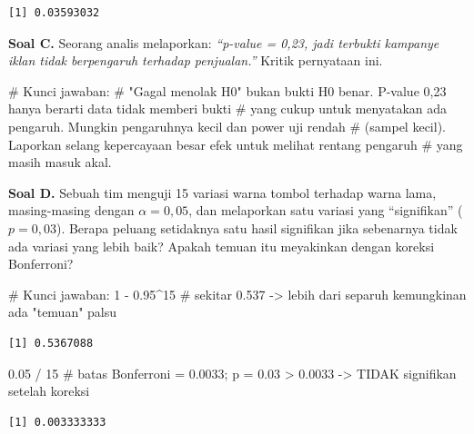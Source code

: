 \documentclass[
  indonesian,
  letterpaper,
]{book}
\newenvironment{Shaded}{\begin{snugshade}}{\end{snugshade}}
\newcommand{\CommentTok}[1]{\textcolor[rgb]{0.37,0.37,0.37}{#1}}
\newcommand{\DecValTok}[1]{\textcolor[rgb]{0.68,0.00,0.00}{#1}}
\newcommand{\FloatTok}[1]{\textcolor[rgb]{0.68,0.00,0.00}{#1}}
\newcommand{\SpecialCharTok}[1]{\textcolor[rgb]{0.37,0.37,0.37}{#1}}
\begin{document}
\begin{verbatim}
[1] 0.03593032
\end{verbatim}

\textbf{Soal C.} Seorang analis melaporkan: \emph{``p-value = 0,23, jadi
terbukti kampanye iklan tidak berpengaruh terhadap penjualan.''} Kritik
pernyataan ini.

\begin{Shaded}
\begin{Highlighting}[]
\CommentTok{\# Kunci jawaban:}
\CommentTok{\# "Gagal menolak H0" bukan bukti H0 benar. P{-}value 0,23 hanya berarti data tidak memberi bukti}
\CommentTok{\# yang cukup untuk menyatakan ada pengaruh. Mungkin pengaruhnya kecil dan power uji rendah}
\CommentTok{\# (sampel kecil). Laporkan selang kepercayaan besar efek untuk melihat rentang pengaruh}
\CommentTok{\# yang masih masuk akal.}
\end{Highlighting}
\end{Shaded}

\textbf{Soal D.} Sebuah tim menguji 15 variasi warna tombol terhadap
warna lama, masing-masing dengan \(\alpha = 0{,}05\), dan melaporkan
satu variasi yang ``signifikan'' (\(p = 0{,}03\)). Berapa peluang
setidaknya satu hasil signifikan jika sebenarnya tidak ada variasi yang
lebih baik? Apakah temuan itu meyakinkan dengan koreksi Bonferroni?

\begin{Shaded}
\begin{Highlighting}[]
\CommentTok{\# Kunci jawaban:}
\DecValTok{1} \SpecialCharTok{{-}} \FloatTok{0.95}\SpecialCharTok{\^{}}\DecValTok{15}   \CommentTok{\# sekitar 0.537 {-}\textgreater{} lebih dari separuh kemungkinan ada "temuan" palsu}
\end{Highlighting}
\end{Shaded}

\begin{verbatim}
[1] 0.5367088
\end{verbatim}

\begin{Shaded}
\begin{Highlighting}[]
\FloatTok{0.05} \SpecialCharTok{/} \DecValTok{15}     \CommentTok{\# batas Bonferroni = 0.0033; p = 0.03 \textgreater{} 0.0033 {-}\textgreater{} TIDAK signifikan setelah koreksi}
\end{Highlighting}
\end{Shaded}

\begin{verbatim}
[1] 0.003333333
\end{verbatim}
\end{document}
